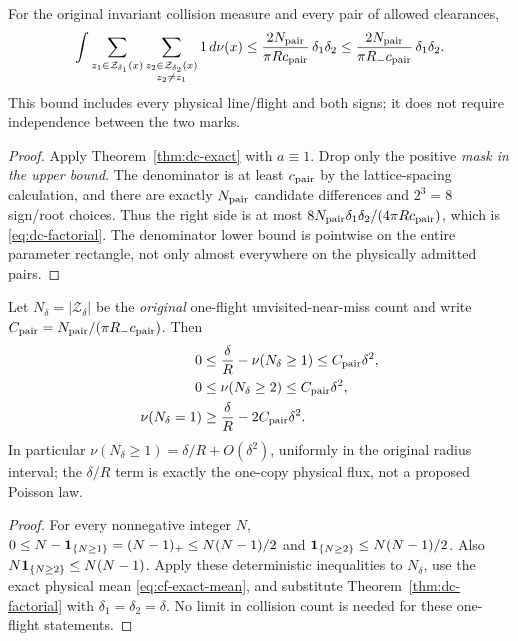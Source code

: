 \begin{theorem}
\label{thm:dc-factorial}
For the original invariant collision measure and every pair of
allowed clearances,
\begin{equation}\label{eq:dc-factorial}
 \int \sum_{z_1\in\mathcal Z_{\delta_1}(x)}
   \sum_{\substack{z_2\in\mathcal Z_{\delta_2}(x)\\z_2\ne z_1}}
                 1\,d\nu(x)
 \le\frac{2N_{\rm pair}}{\pi R c_{\rm pair}}\,\delta_1\delta_2
 \le\frac{2N_{\rm pair}}{\pi R_-c_{\rm pair}}\,\delta_1\delta_2.
\end{equation}
This bound includes every physical line/flight and both signs; it
does not require independence between the two marks.
\end{theorem}
\begin{proof}
Apply Theorem~\ref{thm:dc-exact} with $a\equiv1$.  Drop only the
positive \emph{mask in the upper bound}.  The denominator is at
least $c_{\rm pair}$ by the lattice-spacing calculation, and there
are exactly $N_{\rm pair}$ candidate differences and $2^3=8$
sign/root choices.  Thus the right side is at most
$8N_{\rm pair}\delta_1\delta_2/(4\pi Rc_{\rm pair})$, which is
\eqref{eq:dc-factorial}.  The denominator lower bound is pointwise
on the entire parameter rectangle, not only almost everywhere
on the physically admitted pairs.
\end{proof}

\begin{corollary}
\label{cor:dc-unique}
Let $N_\delta=|\mathcal Z_\delta|$ be the \emph{original} one-flight
unvisited-near-miss count and write
$C_{\rm pair}=N_{\rm pair}/(\pi R_-c_{\rm pair})$.  Then
\begin{align}
 0&\le\frac{\delta}{R}-\nu(N_\delta\ge1)
                    \le C_{\rm pair}\delta^2,
                                      \label{eq:dc-union}\\
 0&\le\nu(N_\delta\ge2)
                    \le C_{\rm pair}\delta^2,\label{eq:dc-multiple}\\
 \nu(N_\delta=1)&\ge\frac{\delta}{R}
                       -2C_{\rm pair}\delta^2.
                                      \label{eq:dc-exact-one}
\end{align}
In particular $\nu(N_\delta\ge1)=\delta/R+O(\delta^2)$,
uniformly in the original radius interval; the $\delta/R$ term is
exactly the one-copy physical flux, not a proposed Poisson law.
\end{corollary}
\begin{proof}
For every nonnegative integer $N$,
$0\le N-\mathbf1_{\{N\ge1\}}=(N-1)_+\le N(N-1)/2$ and
$\mathbf1_{\{N\ge2\}}\le N(N-1)/2$.  Also
$N\mathbf1_{\{N\ge2\}}\le N(N-1)$.  Apply these deterministic
inequalities to $N_\delta$, use the exact physical mean
\eqref{eq:cf-exact-mean}, and substitute
Theorem~\ref{thm:dc-factorial} with
$\delta_1=\delta_2=\delta$.  No limit in collision count is
needed for these one-flight statements.
\end{proof}

